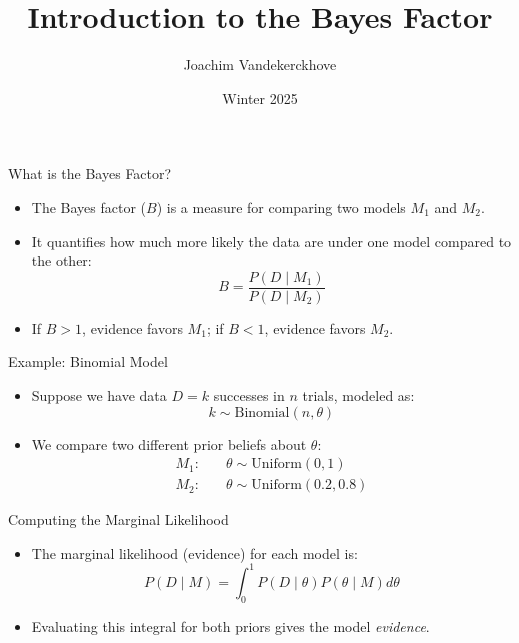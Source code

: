 \documentclass[aspectratio=169]{beamer}
\title{Introduction to the Bayes Factor}
\author{Joachim Vandekerckhove}
\date{Winter 2025}
\begin{document}
\frame{\titlepage}

\begin{frame}{What is the Bayes Factor?}
    \begin{itemize}
        \item The Bayes factor (\( B \)) is a measure for comparing two models \( M_1 \) and \( M_2 \).
        \item It quantifies how much more likely the data are under one model compared to the other:
        \[
            B = \frac{P(D \mid M_1)}{P(D \mid M_2)}
        \]
        \item If \( B > 1 \), evidence favors \( M_1 \); if \( B < 1 \), evidence favors \( M_2 \).
    \end{itemize}
\end{frame}

\begin{frame}{Example: Binomial Model}
    \begin{itemize}
        \item Suppose we have data \( D = k \) successes in \( n \) trials, modeled as:
        \[
            k \sim \text{Binomial}(n, \theta)
        \]
        \item We compare two different prior beliefs about \( \theta \):
        \begin{align*}
            M_1: \quad & \theta \sim \text{Uniform}(0,1) \\
            M_2: \quad & \theta \sim \text{Uniform}(0.2,0.8)
        \end{align*}
    \end{itemize}
\end{frame}

\begin{frame}{Computing the Marginal Likelihood}
    \begin{itemize}
        \item The marginal likelihood (evidence) for each model is:
        \[
            P(D \mid M) = \int_0^1 P(D \mid \theta) P(\theta \mid M) d\theta
        \]
        \item Evaluating this integral for both priors gives the model \emph{evidence}.
    \end{itemize}
\end{frame}
\end{document}
